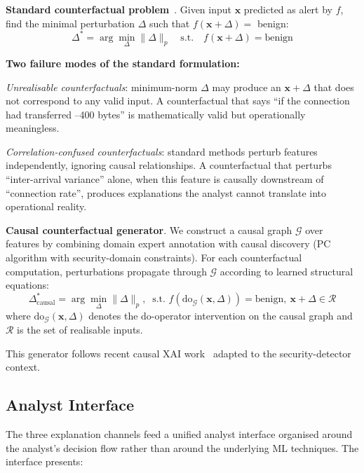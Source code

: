 \documentclass[sigconf,nonacm]{acmart}
\begin{document}
\textbf{Standard counterfactual problem}~\cite{wachter2017counterfactual}.
Given input $\mathbf{x}$ predicted as alert by $f$, find the minimal
perturbation $\Delta$ such that $f(\mathbf{x} + \Delta) = $ benign:
\begin{equation}
  \Delta^* = \arg\min_\Delta \|\Delta\|_p \quad
  \text{s.t.} \quad f(\mathbf{x}+\Delta) = \text{benign}
\end{equation}

\textbf{Two failure modes of the standard formulation:}

\emph{Unrealisable counterfactuals}: minimum-norm $\Delta$ may produce an
$\mathbf{x} + \Delta$ that does not correspond to any valid input. A
counterfactual that says ``if the connection had transferred --400 bytes''
is mathematically valid but operationally meaningless.

\emph{Correlation-confused counterfactuals}: standard methods perturb
features independently, ignoring causal relationships. A counterfactual
that perturbs ``inter-arrival variance'' alone, when this feature is
causally downstream of ``connection rate'', produces explanations the
analyst cannot translate into operational reality.

\textbf{Causal counterfactual generator}. We construct a causal graph
$\mathcal{G}$ over features by combining domain expert annotation with
causal discovery (PC algorithm with security-domain constraints). For each
counterfactual computation, perturbations propagate through $\mathcal{G}$
according to learned structural equations:
\begin{equation}
  \Delta^*_\text{causal} = \arg\min_\Delta \|\Delta\|_p,\
  \text{ s.t. } 
  f(\text{do}_\mathcal{G}(\mathbf{x}, \Delta)){=}\text{benign},\
  \mathbf{x}{+}\Delta {\in} \mathcal{R}
\end{equation}
where $\text{do}_\mathcal{G}(\mathbf{x}, \Delta)$ denotes the do-operator
intervention on the causal graph and $\mathcal{R}$ is the set of realisable
inputs.

This generator follows recent causal XAI
work~\cite{beckers2024causal,janzing2024causal} adapted to the
security-detector context.

\subsection{Analyst Interface}

The three explanation channels feed a unified analyst interface organised
around the analyst's decision flow rather than around the underlying ML
techniques. The interface presents:
\end{document}
